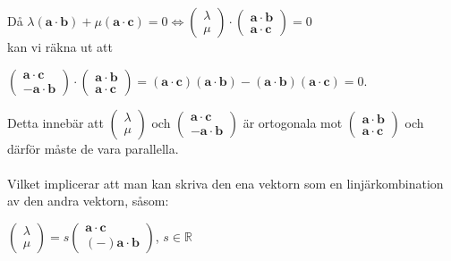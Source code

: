 Då $\lambda (\bm{a}\cdot \bm{b})+\mu (\bm{a}\cdot \bm{c})=0 \Leftrightarrow \begin{pmatrix}\lambda\\\mu\end{pmatrix} \cdot \begin{pmatrix}\bm{a}\cdot \bm{b}\\ \bm{a} \cdot \bm{c} \end{pmatrix} = 0$\\
kan vi räkna ut att 
\begin{center}
    $\begin{pmatrix}\bm{a}\cdot \bm{c}\\ \bm{-a} \cdot \bm{b} \end{pmatrix}\cdot\begin{pmatrix}\bm{a}\cdot \bm{b}\\ \bm{a} \cdot \bm{c} \end{pmatrix} = (\bm{a}\cdot\bm{c})(\bm{a}\cdot\bm{b})-(\bm{a}\cdot\bm{b})(\bm{a}\cdot\bm{c})=0$.
\end{center}
Detta innebär att $\begin{pmatrix}\lambda\\\mu\end{pmatrix}$ och $\begin{pmatrix}\bm{a}\cdot \bm{c}\\ \bm{-a} \cdot \bm{b} \end{pmatrix}$ är ortogonala mot $\begin{pmatrix}\bm{a}\cdot \bm{b}\\ \bm{a} \cdot \bm{c} \end{pmatrix}$ och
därför måste de vara parallella.\\\\
Vilket implicerar att man kan skriva den ena vektorn som en linjärkombination av den andra vektorn, såsom:
\begin{center}
    $\begin{pmatrix}\lambda\\\mu\end{pmatrix}=s\begin{pmatrix}\bm{a}\cdot\bm{c}\\ (-)\bm{a}\cdot\bm{b}\end{pmatrix}$, $s \in \mathbb{R}$
\end{center}